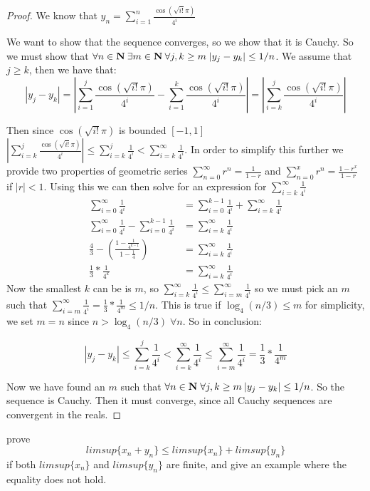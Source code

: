 \documentclass[11pt]{article}
\begin{document}
\begin{proof}

We know that $y_n = \sum_{i = 1} ^n \frac{\cos(\sqrt{i!}\pi)}{4^i}$

We want to show that the sequence converges, so we show that it is Cauchy. So we must show that $\forall n \in \mathbf{N} \: \exists m \in \mathbf{N} \: \forall j,k \geq m \; |y_j - y_k| \leq 1/n$. 
We assume that $j \geq k$, then we have that:
$$|y_j - y_k| = \left| \sum_{i = 1} ^j \frac{\cos(\sqrt{i!}\pi)}{4^i} - \sum_{i = 1} ^k \frac{\cos(\sqrt{i!}\pi)}{4^i} \right| = \left| \sum_{i = k} ^j \frac{\cos(\sqrt{i!}\pi)}{4^i} \right|$$

Then since $\cos(\sqrt{i!}\pi)$ is bounded $[-1, 1]$ 
$\left| \sum_{i = k} ^j \frac{\cos(\sqrt{i!}\pi)}{4^i} \right| \leq \sum_{i = k} ^j \frac{1}{4^i} < \sum_{i = k} ^\infty \frac{1}{4^i}$.
 In order to simplify this further we provide two properties of geometric series $\sum_{n=0}^\infty r^n = \frac{1}{1-r}$ and $\sum_{n=0}^x r^n = \frac{1-r^x}{1-r}$ if $|r| < 1$. Using this we can then solve for an expression for $\sum_{i = k} ^\infty \frac{1}{4^i}$
\begin{align*}
\sum_{i=0}^\infty \frac{1}{4^i} &= \sum_{i=0}^{k-1} \frac{1}{4^i} + \sum_{i=k}^\infty \frac{1}{4^i}\\
\sum_{i=0}^\infty \frac{1}{4^i} - \sum_{i=0}^{k-1} \frac{1}{4^i} &= \sum_{i=k}^\infty \frac{1}{4^i}\\
\frac{4}{3} - \left(\frac{1 - \frac{1}{4^{k-1}}}{1-\frac{1}{4}} \right) &= \sum_{i=k}^\infty \frac{1}{4^i}\\
\frac{1}{3} * \frac{1}{4^k} &= \sum_{i=k}^\infty \frac{1}{4^i}
\end{align*}
Now the smallest $k$ can be is $m$, so $\sum_{i = k} ^\infty \frac{1}{4^i} \leq \sum_{i = m} ^\infty \frac{1}{4^i}$ so we must pick an $m$ such that $\sum_{i=m}^\infty \frac{1}{4^i} = \frac{1}{3} * \frac{1}{4^m} \leq 1/n$. This is true if $\log_4(n/3) \leq m$ for simplicity, we set $m = n$ since $n > \log_4(n/3) \; \forall n$. So in conclusion:

$$|y_j - y_k| \leq \sum_{i = k} ^j \frac{1}{4^i} < \sum_{i = k} ^\infty \frac{1}{4^i} \leq \sum_{i = m} ^\infty \frac{1}{4^i} = \frac{1}{3} * \frac{1}{4^m}$$

Now we have found an $m$ such that $\forall n \in \mathbf{N} \; \forall j,k \geq m \: |y_j - y_k| \leq 1/n$. So the sequence is Cauchy. Then it must converge, since all Cauchy sequences are convergent in the reals.

\end{proof}


\newpage
{}

prove
$$limsup\{x_n + y_n\} \leq limsup\{x_n\} + limsup\{y_n\}$$
if both $limsup\{x_n\}$ and $limsup\{y_n\}$ are finite, and give an example where the equality does not hold.
\end{document}

